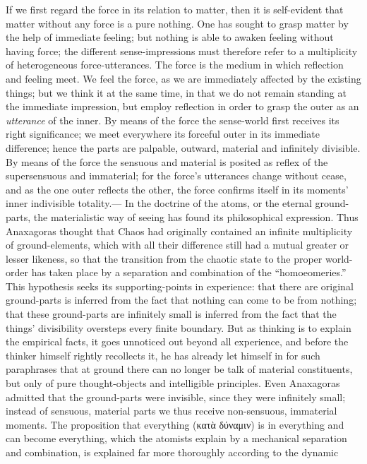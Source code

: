 \documentclass[12pt]{book}
\begin{document}
If we first regard the force in its relation to matter, then it is
self-evident that matter without any force is a pure nothing. One has sought
to grasp matter by the help of immediate feeling; but nothing is able to
awaken feeling without having force; the different sense-impressions must
therefore refer to a multiplicity of heterogeneous force-utterances. The
force is the medium in which reflection and feeling meet. We feel the force,
as we are immediately affected by the existing things; but we think it at
the same time, in that we do not remain standing at the immediate
impression, but employ reflection in order to grasp the outer as an
\emph{utterance} of the inner. By means of the force the sense-world first
receives its right significance; we meet everywhere its forceful outer in
its immediate difference; hence the parts are palpable, outward, material
and infinitely divisible. By means of the force the sensuous and material is
posited as reflex of the supersensuous and immaterial; for the force's
utterances change without cease, and as the one outer reflects the other,
the force confirms itself in its moments' inner indivisible totality.--- In
the doctrine of the atoms, or the eternal ground-parts, the materialistic
way of seeing has found its philosophical expression. Thus Anaxagoras
thought that Chaos had originally contained an infinite multiplicity of
ground-elements, which with all their difference still had a mutual greater
or lesser likeness, so that the transition from the chaotic state to the
proper world-order has taken place by a separation and combination of the
``homoeomeries.'' This hypothesis seeks its supporting-points in experience:
that there are original ground-parts is inferred from the fact that nothing
can come to be from nothing; that these ground-parts are infinitely small is
inferred from the fact that the things' divisibility oversteps every finite
boundary. But as thinking is to explain the empirical facts, it goes
unnoticed out beyond all experience, and before the thinker himself rightly
recollects it, he has already let himself in for such paraphrases that at
ground there can no longer be talk of material constituents, but only of
pure thought-objects and intelligible principles. Even Anaxagoras admitted
that the ground-parts were invisible, since they were infinitely small;
instead of sensuous, material parts we thus receive non-sensuous, immaterial
moments. The proposition that everything (κατὰ δύναμιν) is in everything and
can become everything, which the atomists explain by a mechanical separation
and combination, is explained far more thoroughly according to the dynamic
\end{document}
